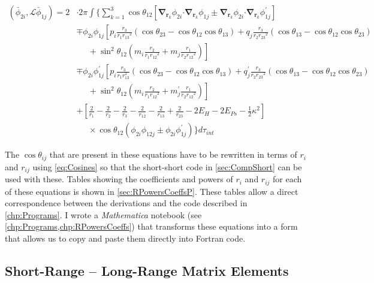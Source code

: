 \documentclass[Dissertation.tex]{subfiles}
\begin{document}
\begin{align}
\label{eq:PWavePhi2Phi1}
\left(\bar{\phi}_{2i},\mathcal{L} \bar{\phi}_{1j}\right) = 2 & \cdot 2\pi \int \Bigg\{ \sum_{k=1}^3 \cos\theta_{12} \left[ \boldsymbol{\nabla}_{\!\mathbf{r}_k} \nonumber \phi_{2i} \boldsymbol{\cdot} \boldsymbol{\nabla}_{\!\mathbf{r}_k} \phi_{1j} \pm \boldsymbol{\nabla}_{\!\mathbf{r}_k} \phi_{2i} \boldsymbol{\cdot} \boldsymbol{\nabla}_{\!\mathbf{r}_k} \phi_{1j}^\prime \right] \\
 \nonumber &\mp \phi_{2i} \phi_{1j} \left[p_i \frac{r_3}{r_1 {r_{13}}^2} (\cos\theta_{23} - \cos\theta_{12} \cos\theta_{13}) + q_j \frac{r_3}{r_2 {r_{23}}^2}(\cos\theta_{13}-\cos\theta_{12} \cos\theta_{23})\right.\\
 \nonumber & \left. \;\;\;\;\;  + \sin^2\theta_{12} \left(m_i \frac{r_2}{r_1 {r_{12}}^2} + m_j \frac{r_1}{r_2 {r_{12}}^2} \right) \right] \\
 \nonumber &\mp \phi_{2i} \phi_{1j}^\prime \left[p_i \frac{r_3}{r_1 r_{13}^2} (\cos\theta_{23} - \cos\theta_{12} \cos\theta_{13}) + q_j^\prime \frac{r_3}{r_2 {r_{23}}^2}(\cos\theta_{13}-\cos\theta_{12} \cos\theta_{23})\right.\\
 \nonumber & \left. \;\;\;\;\;  + \sin^2\theta_{12} \left(m_i \frac{r_2}{r_1 {r_{12}}^2} + m_j^\prime \frac{r_1}{r_2 {r_{12}}^2} \right) \right] \\
 \nonumber &+ \left. \left[\frac{2}{r_1} - \frac{2}{r_2} - \frac{2}{r_3} - \frac{2}{r_{12}} - \frac{2}{r_{13}} + \frac{2}{r_{23}} - 2 E_H - 2 E_{Ps} - \frac{1}{2}\kappa^2 \right] \right. \\
 &\;\;\;\;\; \times \cos\theta_{12} \left(\phi_{2i} \phi_{12j} \pm \phi_{2i} \phi_{1j}^\prime \right) \Bigg\} d\tau_{int}
\end{align}

The $\cos\theta_{ij}$ that are present in these equations have to be rewritten in
terms of $r_i$ and $r_{ij}$ using \cref{eq:Cosines} so that the short-short
code in \cref{sec:CompShort} can be used with these.
Tables showing the coefficients and powers of $r_i$ and $r_{ij}$ for each of 
these equations is shown in \cref{sec:RPowersCoeffsP}. These tables allow a 
direct correspondence between the derivations and the code described in
\cref{chp:Programs}. I wrote a \emph{Mathematica} notebook
(see \cref{chp:Programs,chp:RPowersCoeffs}) that transforms
these equations into a form that allows us to copy and paste them directly
into Fortran code.


\subsection{Short-Range -- Long-Range Matrix Elements}
\label{sec:PWaveShortLong}
\end{document}
